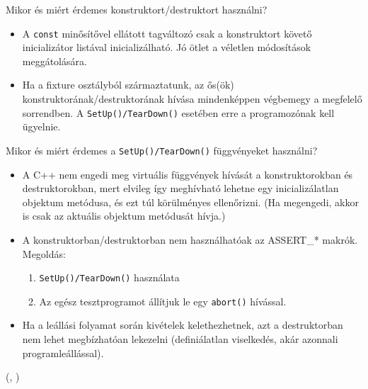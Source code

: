 \begin{frame}
  Mikor és miért érdemes konstruktort/destruktort használni?
  \begin{itemize}
    \item A \texttt{const} minősítővel ellátott tagváltozó csak a konstruktort követő inicializátor listával inicializálható. Jó ötlet
    a véletlen módosítások meggátolására.
    \item Ha a fixture osztályból származtatunk, az ős(ök) konstruktorának/destruktorának hívása mindenképpen végbemegy a megfelelő sorrendben. A \texttt{SetUp()/TearDown()} esetében erre a programozónak kell ügyelnie.
  \end{itemize}
\end{frame}

\begin{frame}
  Mikor és miért érdemes a \texttt{SetUp()/TearDown()} függvényeket használni?
  \begin{itemize}
    \item A C++ nem engedi meg virtuális függvények hívását a konstruktorokban és destruktorokban, mert elvileg így meghívható lehetne egy inicializálatlan objektum metódusa, és ezt túl körülményes ellenőrizni. (Ha megengedi, akkor is csak az aktuális objektum metódusát hívja.)
    \item A konstruktorban/destruktorban nem használhatóak az ASSERT\_* makrók. Megoldás:
    \begin{enumerate}
      \item \texttt{SetUp()/TearDown()} használata
      \item Az egész tesztprogramot állítjuk le egy \texttt{abort()} hívással.
    \end{enumerate}
    \item Ha a leállási folyamat során kivételek kelethezhetnek, azt a destruktorban nem lehet megbízhatóan lekezelni (definiálatlan viselkedés, akár azonnali programleállással).
  \end{itemize}
\end{frame}

\begin{frame}
  \begin{exampleblock}{ %
    (, )}
    \footnotesize
    
  \end{exampleblock}
\end{frame}

